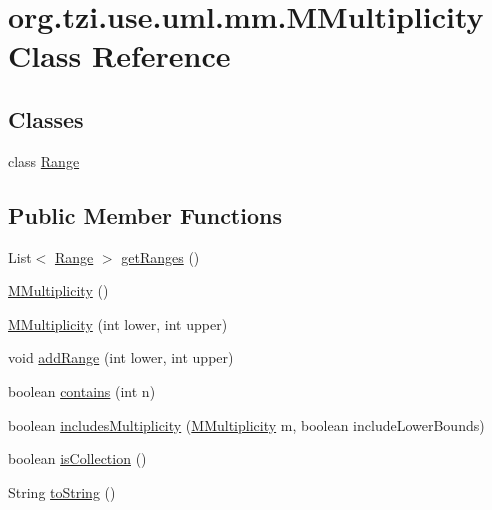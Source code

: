 \hypertarget{classorg_1_1tzi_1_1use_1_1uml_1_1mm_1_1_m_multiplicity}{\section{org.\-tzi.\-use.\-uml.\-mm.\-M\-Multiplicity Class Reference}
\label{classorg_1_1tzi_1_1use_1_1uml_1_1mm_1_1_m_multiplicity}
}
\subsection*{Classes}
\begin{DoxyCompactItemize}
\item 
class \hyperlink{classorg_1_1tzi_1_1use_1_1uml_1_1mm_1_1_m_multiplicity_1_1_range}{Range}
\end{DoxyCompactItemize}
\subsection*{Public Member Functions}
\begin{DoxyCompactItemize}
\item 
List$<$ \hyperlink{classorg_1_1tzi_1_1use_1_1uml_1_1mm_1_1_m_multiplicity_1_1_range}{Range} $>$ \hyperlink{classorg_1_1tzi_1_1use_1_1uml_1_1mm_1_1_m_multiplicity_a5e32d06ff0ba0997751614428b8d2f03}{get\-Ranges} ()
\item 
\hyperlink{classorg_1_1tzi_1_1use_1_1uml_1_1mm_1_1_m_multiplicity_ad96acddfd83717e50391c01a2078cd00}{M\-Multiplicity} ()
\item 
\hyperlink{classorg_1_1tzi_1_1use_1_1uml_1_1mm_1_1_m_multiplicity_aba7e5d8ae1547ed43e64847ed3155077}{M\-Multiplicity} (int lower, int upper)
\item 
void \hyperlink{classorg_1_1tzi_1_1use_1_1uml_1_1mm_1_1_m_multiplicity_a04c8c67d955d427a0e93d06460668f8c}{add\-Range} (int lower, int upper)
\item 
boolean \hyperlink{classorg_1_1tzi_1_1use_1_1uml_1_1mm_1_1_m_multiplicity_af599b58bb5e03017363501d2b740ea2e}{contains} (int n)
\item 
boolean \hyperlink{classorg_1_1tzi_1_1use_1_1uml_1_1mm_1_1_m_multiplicity_a4ff2767e194ce67ede40cf437e111f04}{includes\-Multiplicity} (\hyperlink{classorg_1_1tzi_1_1use_1_1uml_1_1mm_1_1_m_multiplicity}{M\-Multiplicity} m, boolean include\-Lower\-Bounds)
\item 
boolean \hyperlink{classorg_1_1tzi_1_1use_1_1uml_1_1mm_1_1_m_multiplicity_a3d41e5c14832f13d640f3544869a8999}{is\-Collection} ()
\item 
String \hyperlink{classorg_1_1tzi_1_1use_1_1uml_1_1mm_1_1_m_multiplicity_aac5eb6c43d34009b8f056461844453ad}{to\-String} ()
\end{DoxyCompactItemize}
